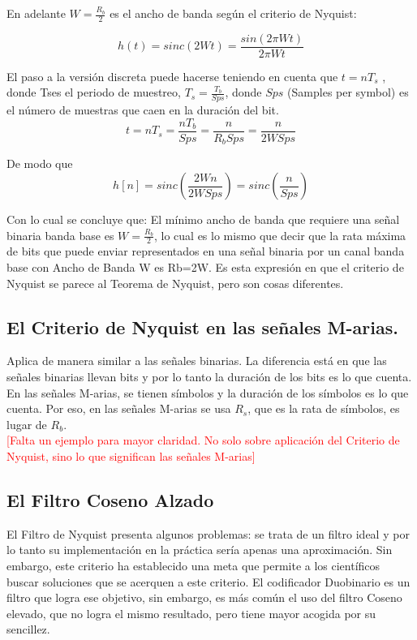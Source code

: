 En adelante $W=\frac{R_b}{2}$ es el ancho de banda según el criterio de Nyquist:

\begin{equation} \label{capcuatro_catorce}
	 h(t) = sinc(2Wt) = \dfrac{sin(2\pi Wt)}{2\pi Wt}
\end{equation}

El paso a la versión discreta puede hacerse teniendo en cuenta que $t=nT_s$ , donde Tses el periodo de muestreo, $T_s = \frac{T_b}{Sps} $, donde $Sps$ (Samples per symbol) es el número de muestras que caen en la duración del bit. \\

\begin{equation} \label{capcuatro_quince}
	 t = nT_s = \dfrac{nT_b}{Sps} = \frac{n}{R_{b}Sps} = \frac{n}{2WSps} 
\end{equation}

De modo que \\

\begin{equation} \label{capcuatro_diesiseis}
	 h[n] = sinc(\dfrac{2Wn}{2WSps}) = sinc(\frac{n}{Sps}) 
\end{equation}

Con lo cual se concluye que: El mínimo ancho de banda que requiere una señal binaria banda base es $W=\frac{R_b}{2}$, lo cual es lo mismo que decir que la rata máxima de bits que puede enviar representados en una señal binaria por un canal banda base con Ancho de Banda W es Rb=2W. Es esta expresión en que el criterio de Nyquist se parece al Teorema de Nyquist, pero son cosas diferentes. \\

\subsection{El Criterio de Nyquist en las señales M-arias.}
Aplica de manera similar a las señales binarias. La diferencia está en que las señales binarias llevan bits y por lo tanto la duración de los bits es lo que cuenta. En las señales M-arias, se tienen símbolos y la duración de los símbolos es lo que cuenta. Por eso, en las señales M-arias se usa $R_s$, que es la rata de símbolos, es lugar de $R_b$.\\ 

\textcolor{red}{[Falta un ejemplo para mayor claridad. No solo sobre aplicación del Criterio de Nyquist, sino lo que significan las señales M-arias]}

\subsection{El Filtro Coseno Alzado}
El Filtro de Nyquist presenta algunos problemas: se trata de un filtro ideal y por lo tanto su implementación en la práctica sería apenas una aproximación. Sin embargo, este criterio ha establecido una meta que permite a los científicos buscar soluciones que se acerquen a este criterio. El codificador Duobinario es un filtro que logra ese objetivo, sin embargo, es más común el uso del filtro Coseno elevado, que no logra el mismo resultado, pero tiene mayor acogida por su sencillez. \\

